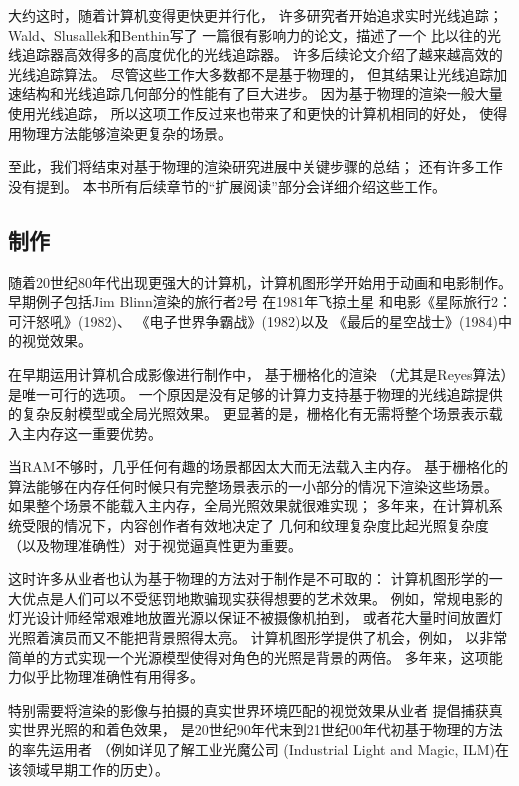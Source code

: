 大约这时，随着计算机变得更快更并行化，
许多研究者开始追求实时光线追踪；
Wald、Slusallek和Benthin\parencite*{10.1007/978-3-7091-6242-2_26}写了
一篇很有影响力的论文，描述了一个
比以往的光线追踪器高效得多的高度优化的光线追踪器。
许多后续论文介绍了越来越高效的光线追踪算法。
尽管这些工作大多数都不是基于物理的，
但其结果让光线追踪加速结构和光线追踪几何部分的性能有了巨大进步。
因为基于物理的渲染一般大量使用光线追踪，
所以这项工作反过来也带来了和更快的计算机相同的好处，
使得用物理方法能够渲染更复杂的场景。

至此，我们将结束对基于物理的渲染研究进展中关键步骤的总结；
还有许多工作没有提到。
本书所有后续章节的“扩展阅读”部分会详细介绍这些工作。

\subsection{制作}\label{sub:制作}
随着20世纪80年代出现更强大的计算机，计算机图形学开始用于动画和电影制作。
早期例子包括Jim Blinn渲染的旅行者2号
在1981年飞掠土星
和电影《星际旅行2：可汗怒吼》(1982)、
《电子世界争霸战》(1982)以及
《最后的星空战士》(1984)中的视觉效果。

在早期运用计算机合成影像进行制作中，
基于栅格化的渲染
（尤其是Reyes算法\citep{10.1145/37401.37414}）是唯一可行的选项。
一个原因是没有足够的计算力支持基于物理的光线追踪提供的复杂反射模型或全局光照效果。
更显著的是，栅格化有无需将整个场景表示载入主内存这一重要优势。

当RAM不够时，几乎任何有趣的场景都因太大而无法载入主内存。
基于栅格化的算法能够在内存任何时候只有完整场景表示的一小部分的情况下渲染这些场景。
如果整个场景不能载入主内存，全局光照效果就很难实现；
多年来，在计算机系统受限的情况下，内容创作者有效地决定了
几何和纹理复杂度比起光照复杂度（以及物理准确性）对于视觉逼真性更为重要。

这时许多从业者也认为基于物理的方法对于制作是不可取的：
计算机图形学的一大优点是人们可以不受惩罚地欺骗现实获得想要的艺术效果。
例如，常规电影的灯光设计师经常艰难地放置光源以保证不被摄像机拍到，
或者花大量时间放置灯光照着演员而又不能把背景照得太亮。
计算机图形学提供了机会，例如，
以非常简单的方式实现一个光源模型使得对角色的光照是背景的两倍。
多年来，这项能力似乎比物理准确性有用得多。

特别需要将渲染的影像与拍摄的真实世界环境匹配的视觉效果从业者
提倡捕获真实世界光照的和着色效果，
是20世纪90年代末到21世纪00年代初基于物理的方法的率先运用者
（例如详见\citet{snow2010terminators}了解工业光魔公司
(Industrial Light and Magic, ILM)在该领域早期工作的历史）。

